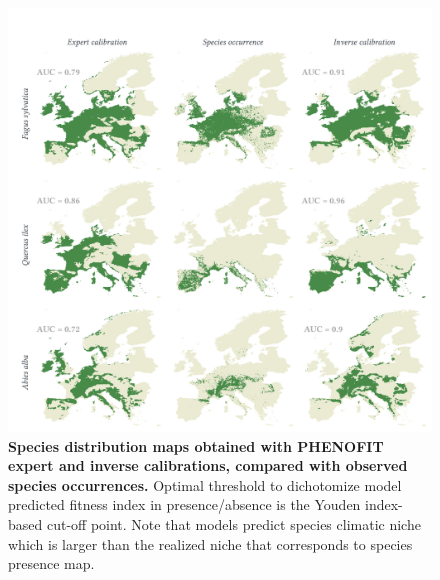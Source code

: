 \begin{figure}
\centering
\includegraphics{chapter1/figs/phenofitmaps} 
\caption{\textbf{Species distribution maps obtained with PHENOFIT expert and inverse calibrations, compared with observed species occurrences.} Optimal threshold to dichotomize model predicted fitness index in presence/absence is the Youden index-based cut-off point. Note that models predict species climatic niche which is larger than the realized niche that corresponds to species presence map.}
\label{fig:phenofitmaps}
\end{figure}

